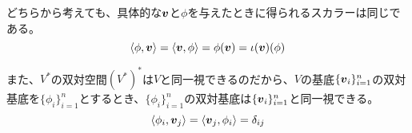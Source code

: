 \documentclass[../../../topic_linear-algebra]{subfiles}
\begin{document}
\br

どちらから考えても、具体的な$\vb*{v}$と$\phi$を与えたときに得られるスカラーは同じである。
\begin{equation*}
  \langle \phi, \vb*{v} \rangle = \langle \vb*{v}, \phi \rangle = \phi(\vb*{v}) = \iota(\vb*{v})(\phi)
\end{equation*}

\br

また、$V^*$の双対空間$(V^*)^*$は$V$と同一視できるのだから、$V$の基底$\{ \vb*{v}_i \}_{i=1}^n$の双対基底を$\{ \phi_i \}_{i=1}^n$とするとき、$\{ \phi_i \}_{i=1}^n$の双対基底は$\{ \vb*{v}_i \}_{i=1}^n$と同一視できる。
\begin{equation*}
  \langle \phi_i, \vb*{v}_j \rangle = \langle \vb*{v}_j, \phi_i \rangle = \delta_{ij}
\end{equation*}
\end{document}
